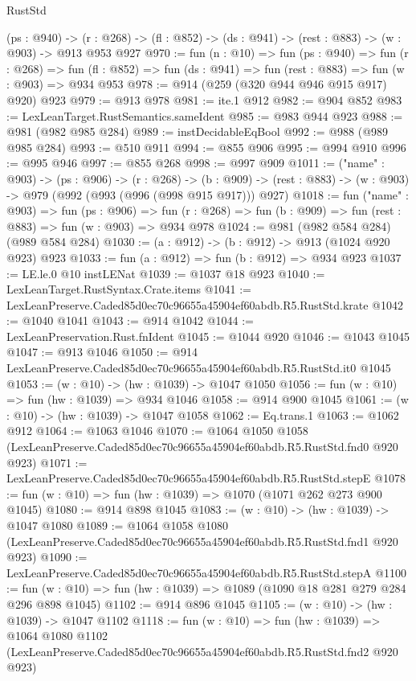 \begin{lexlean}{RustStd}
\begin{coremodule}
  (ps : @940) ->
  (r : @268) -> (fl : @852) -> (ds : @941) -> (rest : @883) -> (w : @903) -> @913 @953 @927
@970 := fun (n : @10) =>
  fun (ps : @940) =>
  fun (r : @268) =>
  fun (fl : @852) => fun (ds : @941) => fun (rest : @883) => fun (w : @903) => @934 @953
@978 := @914 (@259 (@320 @944 @946 @915 @917) @920) @923
@979 := @913 @978
@981 := ite.{1} @912
@982 := @904 @852
@983 := LexLeanTarget.RustSemantics.sameIdent
@985 := @983 @944 @923
@988 := @981 (@982 @985 @284)
@989 := instDecidableEqBool
@992 := @988 (@989 @985 @284)
@993 := @510 @911
@994 := @855 @906
@995 := @994 @910
@996 := @995 @946
@997 := @855 @268
@998 := @997 @909
@1011 := ("name" : @903) ->
  (ps : @906) ->
  (r : @268) ->
  (b : @909) -> (rest : @883) -> (w : @903) -> @979 (@992 (@993 (@996 (@998 @915 @917))) @927)
@1018 := fun ("name" : @903) =>
  fun (ps : @906) =>
  fun (r : @268) => fun (b : @909) => fun (rest : @883) => fun (w : @903) => @934 @978
@1024 := @981 (@982 @584 @284) (@989 @584 @284)
@1030 := (a : @912) -> (b : @912) -> @913 (@1024 @920 @923) @923
@1033 := fun (a : @912) => fun (b : @912) => @934 @923
@1037 := LE.le.{0} @10 instLENat
@1039 := @1037 @18 @923
@1040 := LexLeanTarget.RustSyntax.Crate.items
@1041 := LexLeanPreserve.Caded85d0ec70c96655a45904ef60abdb.R5.RustStd.krate
@1042 := @1040 @1041
@1043 := @914 @1042
@1044 := LexLeanPreservation.Rust.fnIdent
@1045 := @1044 @920
@1046 := @1043 @1045
@1047 := @913 @1046
@1050 := @914 LexLeanPreserve.Caded85d0ec70c96655a45904ef60abdb.R5.RustStd.it0 @1045
@1053 := (w : @10) -> (hw : @1039) -> @1047 @1050
@1056 := fun (w : @10) => fun (hw : @1039) => @934 @1046
@1058 := @914 @900 @1045
@1061 := (w : @10) -> (hw : @1039) -> @1047 @1058
@1062 := Eq.trans.{1}
@1063 := @1062 @912
@1064 := @1063 @1046
@1070 := @1064
    @1050
    @1058
    (LexLeanPreserve.Caded85d0ec70c96655a45904ef60abdb.R5.RustStd.fnd0 @920 @923)
@1071 := LexLeanPreserve.Caded85d0ec70c96655a45904ef60abdb.R5.RustStd.stepE
@1078 := fun (w : @10) => fun (hw : @1039) => @1070 (@1071 @262 @273 @900 @1045)
@1080 := @914 @898 @1045
@1083 := (w : @10) -> (hw : @1039) -> @1047 @1080
@1089 := @1064
    @1058
    @1080
    (LexLeanPreserve.Caded85d0ec70c96655a45904ef60abdb.R5.RustStd.fnd1 @920 @923)
@1090 := LexLeanPreserve.Caded85d0ec70c96655a45904ef60abdb.R5.RustStd.stepA
@1100 := fun (w : @10) => fun (hw : @1039) => @1089 (@1090 @18 @281 @279 @284 @296 @898 @1045)
@1102 := @914 @896 @1045
@1105 := (w : @10) -> (hw : @1039) -> @1047 @1102
@1118 := fun (w : @10) =>
  fun (hw : @1039) =>
  @1064
    @1080
    @1102
    (LexLeanPreserve.Caded85d0ec70c96655a45904ef60abdb.R5.RustStd.fnd2 @920 @923)

\end{coremodule}
\end{lexlean}
